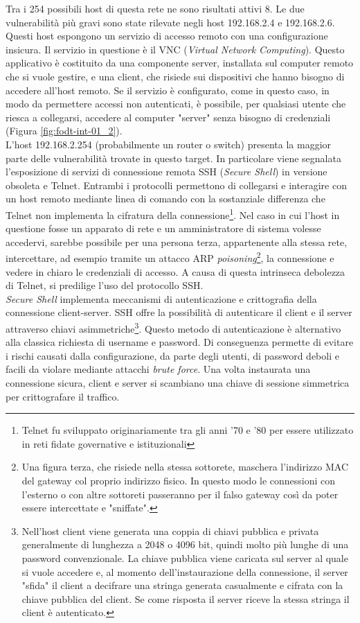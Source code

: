 \documentclass[target=bach,aauheader=]{thud}
\begin{document}
Tra i 254 possibili host di questa rete ne sono risultati attivi 8.
Le due vulnerabilità più gravi sono state rilevate negli host 192.168.2.4 e 192.168.2.6. Questi host espongono un servizio di accesso remoto con una configurazione insicura. Il servizio in questione è il VNC (\textit{Virtual Network Computing}). Questo applicativo è costituito da una componente server, installata sul computer remoto che si vuole gestire, e una client, che risiede sui dispositivi che hanno bisogno di accedere all'host remoto. Se il servizio è configurato, come in questo caso, in modo da permettere accessi non autenticati, è possibile, per qualsiasi utente che riesca a collegarsi, accedere al computer "server" senza bisogno di credenziali (Figura \ref{fig:fodt-int-01_2}).
\\ L’host 192.168.2.254 (probabilmente un router o switch) presenta la maggior parte delle vulnerabilità trovate in questo target. In particolare viene segnalata l’esposizione di servizi di connessione remota SSH (\textit{Secure Shell}) in versione obsoleta e Telnet. Entrambi i protocolli permettono di collegarsi e interagire con un host remoto mediante linea di comando con la sostanziale differenza che Telnet non implementa la cifratura della connessione\footnote{Telnet fu sviluppato originariamente tra gli anni '70 e '80 per essere utilizzato in reti fidate governative e istituzionali}. Nel caso in cui l'host in questione fosse un apparato di rete e un amministratore di sistema volesse accedervi, sarebbe possibile per una persona terza, appartenente alla stessa rete, intercettare, ad esempio tramite un attacco ARP \textit{poisoning}\footnote{Una figura terza, che risiede nella stessa sottorete, maschera l'indirizzo MAC del gateway col proprio indirizzo fisico. In questo modo le connessioni con l'esterno o con altre sottoreti passeranno per il falso gateway così da poter essere intercettate e "sniffate".}, la connessione e vedere in chiaro le credenziali di accesso. A causa di questa intrinseca debolezza di Telnet, si predilige l'uso del protocollo SSH.
\\ \textit{Secure Shell} implementa meccanismi di autenticazione e crittografia della connessione client-server. SSH offre la possibilità di autenticare il client e il server attraverso chiavi asimmetriche\footnote{Nell'host client viene generata una coppia di chiavi pubblica e privata generalmente di lunghezza a 2048 o 4096 bit, quindi molto più lunghe di una password convenzionale. La chiave pubblica viene caricata sul server al quale si vuole accedere e, al momento dell'instaurazione della connessione, il server "sfida" il client a decifrare una stringa generata casualmente e cifrata con la chiave pubblica del client. Se come risposta il server riceve la stessa stringa il client è autenticato.}. Questo metodo di autenticazione è alternativo alla classica richiesta di username e password. Di conseguenza permette di evitare i rischi causati dalla configurazione, da parte degli utenti, di password deboli e facili da violare mediante attacchi \textit{brute force}. Una volta instaurata una connessione sicura, client e server si scambiano una chiave di sessione simmetrica per crittografare il traffico.
\end{document}
